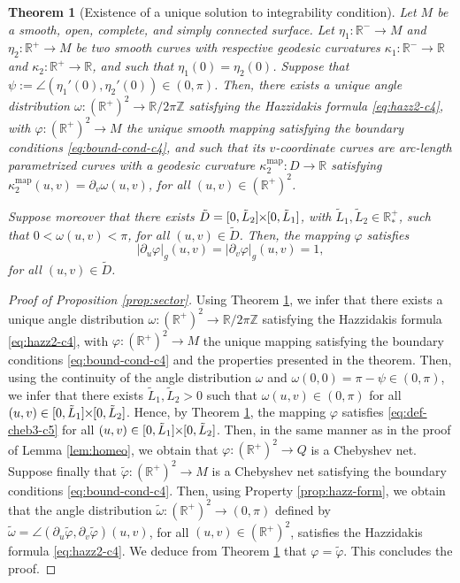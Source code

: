 \documentclass{article}
\newcommand{\PLH}{{\mkern-1mu\times\mkern-1mu}}
\newcommand{\Times}{\PLH}
\newcommand{\R}{\mathbb{R}}
\newcommand{\Z}{\mathbb{Z}}
\newcommand{\surf}{M}
\newcommand{\ko}{\kappa}
\newcommand{\kop}{\kappa^{\mathrm{map}}}
\newcommand{\DU}{\partial_{u}}
\newcommand{\DV}{\partial_{v}}
\newcommand{\sect}{Q}
\newtheorem{theorem}{Theorem}
\theoremstyle{remark}
\theoremstyle{prpart}
\begin{document}
\begin{theorem}[Existence of a unique solution to integrability condition]\label{thm:exist-cond-integr-c5}
Let $\surf$ be a smooth, open, complete, and simply connected surface. Let $\eta_1:\R^-\to\surf$ and $\eta_2:\R^+\to\surf$ be two smooth curves with respective geodesic curvatures $\ko_1:\R^-\to\R$ and $\ko_2:\R^+\to\R$, and such that $\eta_1(0) = \eta_2(0)$. Suppose that $\psi:=\angle(\eta_1'(0),\eta_2'(0))\in(0,\pi)$. Then, there exists a unique angle distribution $\omega:(\R^+)^2\to\R/2\pi\Z$ satisfying the Hazzidakis formula \eqref{eq:hazz2-c4}, with $\varphi:(\R^+)^2\to\surf$ the unique smooth mapping satisfying the boundary conditions \eqref{eq:bound-cond-c4}, and such that its $v$-coordinate curves are arc-length parametrized curves with a geodesic curvature $\kop_2:D\to\R$ satisfying $\kop_2(u,v) = \DV\omega(u,v)$, for all $(u,v)\in (\R^+)^2$.

Suppose moreover that there exists $\tilde D=[0,\tilde L_2]\Times[0,\tilde L_1]$, with $\tilde L_1,\tilde L_2\in\R^+_\ast$, such that $0<\omega(u,v)<\pi$, for all $(u,v)\in \tilde D$. Then, the mapping $\varphi$ satisfies 
\begin{equation}\label{eq:def-cheb3-c5}
  |\DU\varphi|_g(u,v) = |\DV\varphi|_g(u,v)=1,
\end{equation}
for all $(u,v)\in \tilde D$.
\end{theorem}
\begin{proof}[Proof of Proposition \ref{prop:sector}]
  Using Theorem \ref{thm:exist-cond-integr-c5}, we infer that there exists a unique angle distribution $\omega:(\R^+)^2\to\R/2\pi\Z$ satisfying the Hazzidakis formula \eqref{eq:hazz2-c4}, with $\varphi:(\R^+)^2\to\surf$ the unique mapping satisfying the boundary conditions \eqref{eq:bound-cond-c4} and the properties presented in the theorem.
Then, using the continuity of the angle distribution $\omega$ and $\omega(0,0)=\pi-\psi\in(0,\pi)$, we infer that there exists $\tilde L_1,\tilde L_2>0$ such that $\omega(u,v)\in(0,\pi)$ for all $(u,v)\in[0,\tilde L_1]\Times[0,\tilde L_2]$. Hence, by Theorem \ref{thm:exist-cond-integr-c5}, the mapping $\varphi$ satisfies \eqref{eq:def-cheb3-c5} for all $(u,v)\in[0,\tilde L_1]\Times[0,\tilde L_2]$. Then, in the same manner as in the proof of Lemma \ref{lem:homeo}, we obtain that $\varphi:(\R^+)^2\to\sect$ is a Chebyshev net. Suppose finally that $\tilde\varphi:(\R^+)^2\to\surf$ is a Chebyshev net satisfying the boundary conditions \eqref{eq:bound-cond-c4}. Then, using Property \ref{prop:hazz-form}, we obtain that the angle distribution $\tilde\omega:(\R^+)^2\to(0,\pi)$ defined by $\tilde\omega=\angle(\DU\tilde\varphi,\DV\tilde\varphi)(u,v)$, for all $(u,v)\in(\R^+)^2$, satisfies the Hazzidakis formula \eqref{eq:hazz2-c4}. We deduce from Theorem \ref{thm:exist-cond-integr-c5} that $\varphi=\tilde\varphi$. This concludes the proof.
\end{proof}
\end{document}
